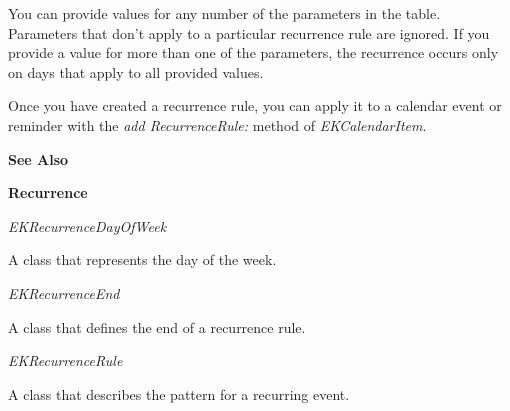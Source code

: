 \documentclass{article}
\begin{document}
You can provide values for any number of the parameters in the table. Parameters that don't apply to a particular recurrence rule are ignored. If you provide a value for more than one of the parameters, the recurrence occurs only on days that apply to all provided values.

Once you have created a recurrence rule, you can apply it to a calendar event or reminder with the \textit{add RecurrenceRule:} method of \textit{EKCalendarItem}.

\textbf{See Also}

\textbf{Recurrence}

\textit{EKRecurrenceDayOfWeek}

A class that represents the day of the week.

\textit{EKRecurrenceEnd}

A class that defines the end of a recurrence rule.

\textit{EKRecurrenceRule}

A class that describes the pattern for a recurring event.
\newpage
\end{document}
